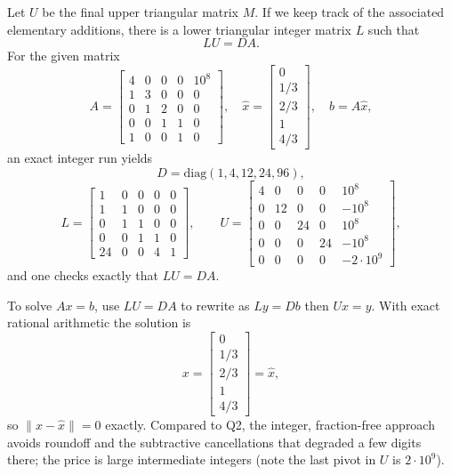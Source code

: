 \documentclass[11pt]{article}
\begin{document}
Let \(U\) be the final upper triangular matrix \(M\). If we keep track of the associated elementary additions, there is a lower triangular integer matrix \(L\) such that
\[
LU=DA.
\]
For the given matrix
\[
A=
\begin{bmatrix}
4&0&0&0&10^{8}\\
1&3&0&0&0\\
0&1&2&0&0\\
0&0&1&1&0\\
1&0&0&1&0
\end{bmatrix},
\quad
\hat x=
\begin{bmatrix}
0\\ 1/3\\ 2/3\\ 1\\ 4/3
\end{bmatrix},
\quad
b=A\hat x,
\]
an exact integer run yields
\[
D=\mathrm{diag}(1,4,12,24,96),
\]
\[
L=
\begin{bmatrix}
1&0&0&0&0\\
1&1&0&0&0\\
0&1&1&0&0\\
0&0&1&1&0\\
24&0&0&4&1
\end{bmatrix},
\qquad
U=
\begin{bmatrix}
4&0&0&0&10^{8}\\
0&12&0&0&-10^{8}\\
0&0&24&0&10^{8}\\
0&0&0&24&-10^{8}\\
0&0&0&0&-2\cdot 10^{9}
\end{bmatrix},
\]
and one checks exactly that \(LU=DA\).

To solve \(Ax=b\), use \(LU=DA\) to rewrite as \(Ly=Db\) then \(Ux=y\). With exact rational arithmetic the solution is
\[
x=
\begin{bmatrix}
0\\ 1/3\\ 2/3\\ 1\\ 4/3
\end{bmatrix}=\hat x,
\]
so \(\lVert x-\hat x\rVert=0\) exactly. Compared to Q2, the integer, fraction-free approach avoids roundoff and the subtractive cancellations that degraded a few digits there; the price is large intermediate integers (note the last pivot in \(U\) is \(2\cdot 10^{9}\)).
\end{document}
